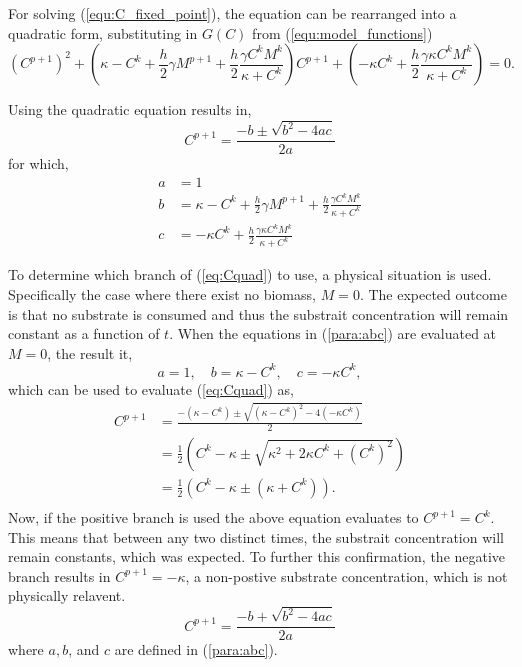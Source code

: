 For solving (\ref{equ:C_fixed_point}), the equation can be rearranged into a quadratic form, substituting in $G(C)$ from (\ref{equ:model_functions})
\begin{equation}
  \left(C^{p+1}\right)^2 + \left( \kappa - C^k + \frac{h}{2} \gamma M^{p+1} + \frac{h}{2} \frac{ \gamma C^k M^k}{\kappa + C^k} \right) C^{p+1} + \left( -\kappa C^k + \frac{h}{2} \frac{\gamma \kappa C^k M^k}{\kappa + C^k} \right) = 0.
\end{equation}

Using the quadratic equation results in, 
  \begin{equation} \label{eq:Cquad}
    C^{p+1} = \frac{-b \pm \sqrt{b^2 - 4ac}}{2a}
  \end{equation}  
  for which, 
  \begin{equation} \begin{aligned} \label{para:abc}
    a &= 1\\
    b &= \kappa - C^k + \frac{h}{2} \gamma M^{p+1} + \frac{h}{2} \frac{\gamma C^k M^k}{\kappa + C^k} \\
    c &= -\kappa C^k + \frac{h}{2} \frac{\gamma \kappa C^k M^k}{\kappa + C^k}
  \end{aligned}  \end{equation}
  
  To determine which branch of (\ref{eq:Cquad}) to use, a physical situation is used. 
  Specifically the case where there exist no biomass, $M = 0$. 
  The expected outcome is that no substrate is consumed and thus the substrait concentration will remain constant as a function of $t$. 
  When the equations in (\ref{para:abc}) are evaluated at $M = 0$, the result it,
  \begin{equation}
    a = 1, \quad b = \kappa - C^k, \quad c = -\kappa C^k,
  \end{equation} 
  which can be used to evaluate (\ref{eq:Cquad}) as,
  \begin{equation} \begin{aligned}
    C^{p+1} &= \frac{- (\kappa - C^k) \pm \sqrt{(\kappa - C^k)^2 - 4 (-\kappa C^k)}}{2} \\
      &= \frac{1}{2} \left( C^k - \kappa \pm \sqrt{\kappa^2 + 2 \kappa C^k + \left(C^k \right) ^2}\right) \\
      &= \frac{1}{2} \left( C^k - \kappa \pm (\kappa+C^k) \right). \\
  \end{aligned} \end{equation}
  Now, if the positive branch is used the above equation evaluates to $C^{p+1} = C^k$. 
  This means that between any two distinct times, the substrait concentration will remain constants, which was expected. 
  To further this confirmation, the negative branch results in $C^{p+1} = -\kappa $, a non-postive substrate concentration, which is not physically relavent. 
  \begin{equation}
    C^{p+1} = \frac{-b + \sqrt{b^2 - 4ac}}{2a}
  \end{equation} 
  where $a,b$, and $c$ are defined in (\ref{para:abc}).



